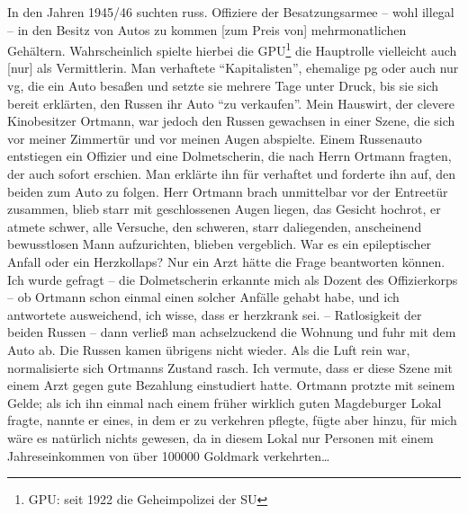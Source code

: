 \documentclass[a5paper,pagesize,10pt,twoside=true]{scrbook}
\begin{document}
In den Jahren 1945/46 suchten russ. Offiziere der Besatzungsarmee -- wohl illegal -- in den Besitz von Autos zu kommen [zum Preis von] mehrmonatlichen Gehältern. Wahrscheinlich spielte hierbei die GPU\footnote{GPU: seit 1922 die Geheimpolizei der SU} die Hauptrolle vielleicht auch [nur] als Vermittlerin. Man verhaftete \enquote{Kapitalisten}, ehemalige \ac{pg} oder auch nur \ac{vg}, die ein Auto besaßen und setzte sie mehrere Tage unter Druck, bis sie sich bereit erklärten, den Russen ihr Auto \enquote{zu verkaufen}. Mein Hauswirt, der clevere Kinobesitzer Ortmann, war jedoch den Russen gewachsen in einer Szene, die sich vor meiner Zimmertür und vor meinen Augen abspielte. Einem Russenauto entstiegen ein Offizier und eine Dolmetscherin, die nach Herrn Ortmann fragten, der auch sofort erschien. Man erklärte ihn für verhaftet und forderte ihn auf, den beiden zum Auto zu folgen. Herr Ortmann brach unmittelbar vor der Entreetür zusammen, blieb starr mit geschlossenen Augen liegen, das Gesicht hochrot, er atmete schwer, alle Versuche, den schweren, starr daliegenden, anscheinend bewusstlosen Mann aufzurichten, blieben vergeblich. War es ein epileptischer Anfall oder ein Herzkollaps? Nur ein Arzt hätte die Frage beantworten können. Ich wurde gefragt -- die Dolmetscherin erkannte mich als Dozent des Offizierkorps -- ob Ortmann schon einmal einen solcher Anfälle gehabt habe, und ich antwortete ausweichend, ich wisse, dass er herzkrank sei. -- Ratlosigkeit der beiden Russen -- dann verließ man achselzuckend die Wohnung und fuhr mit dem Auto ab. Die Russen kamen übrigens nicht wieder. Als die Luft rein war, normalisierte sich Ortmanns Zustand rasch. Ich vermute, dass er diese Szene mit einem Arzt gegen gute Bezahlung einstudiert hatte. Ortmann protzte mit seinem Gelde; als ich ihn einmal nach einem früher wirklich guten Magdeburger Lokal fragte, nannte er eines, in dem er zu verkehren pflegte, fügte aber hinzu, für mich wäre es natürlich nichts gewesen, da in diesem Lokal nur Personen mit einem Jahreseinkommen von über \num{100000} Goldmark verkehrten\dots
\end{document}
